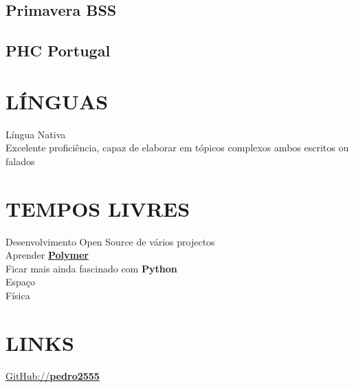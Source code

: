\documentclass[letterpaper]{deedy-resume} %
\begin{document}
\begin{minipage}[t]{0.33\textwidth}
\subsection{Primavera BSS}
\subsection{PHC Portugal}

\sectionspace

\section{LÍNGUAS}
Língua Nativa\\
Excelente proficiência, capaz de elaborar em tópicos complexos ambos escritos ou falados\\

\section{TEMPOS LIVRES}
Desenvolvimento Open Source de vários projectos\\
Aprender \textbf{\href{https://www.polymer-project.org/}{Polymer}}\\
Ficar mais ainda fascinado com \textbf{Python}\\
Espaço\\
Física\\

\section{LINKS}
\href{https://github.com/pedro2555}{GitHub://\textbf{pedro2555}}\\

\end{minipage}
\hfill
%
%
\end{document}
